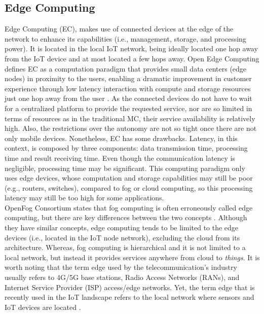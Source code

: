 \subsection{Edge Computing}
Edge Computing (EC), makes use of connected devices at the edge of the network to enhance its capabilities (i.e., management, storage, and processing power). It is located in the local IoT network, being ideally located one hop away from the IoT device and at most located a few hops away. Open Edge Computing defines EC as a computation paradigm that provides small data centers (edge nodes) in proximity to the users, enabling a dramatic improvement in customer experience through low latency interaction with compute and storage resources just one hop away from the user \cite{OpenEdge73:online}. As the connected devices do not have to wait for a centralized platform to provide the requested service, nor are so limited in terms of resources as in the traditional MC, their service availability is relatively high. Also, the restrictions over the autonomy are not so tight once there are not only mobile devices. Nonetheless, EC has some drawbacks. Latency, in this context, is composed by three components: data transmission time, processing time and result receiving time. Even though the communication latency is negligible, processing time may be significant. This computing paradigm only uses edge devices, whose computation and storage capabilities may still be poor (e.g., routers, switches), compared to fog or cloud computing, so this processing latency may still be too high for some applications.\\
\noindent\tab OpenFog Consortium states that fog computing is often erroneously called edge computing, but there are key differences between the two concepts \cite{openfog2017openfog}. Although they have similar concepts, edge computing tends to be limited to the edge devices (i.e., located in the IoT node network), excluding the cloud from its architecture. Whereas, fog computing is hierarchical and it is not limited to a local network, but instead it provides services anywhere from cloud to \textit{things}. It is worth noting that the term edge used by the telecommunication's industry usually refers to 4G/5G base stations, Radio Access Networks (RANs), and Internet Service Provider (ISP) access/edge networks. Yet, the term edge that is recently used in the IoT landscape refers to the local network where sensors and IoT devices are located \cite{yousefpour2018all}.

